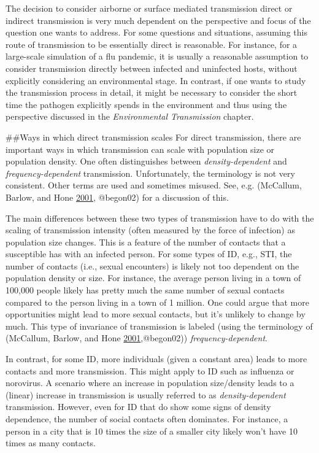 \documentclass[]{book}
\theoremstyle{definition}
\theoremstyle{definition}
\theoremstyle{definition}
\theoremstyle{remark}
\begin{document}
The decision to consider airborne or surface mediated transmission
direct or indirect transmission is very much dependent on the
perspective and focus of the question one wants to address. For some
questions and situations, assuming this route of transmission to be
essentially direct is reasonable. For instance, for a large-scale
simulation of a flu pandemic, it is usually a reasonable assumption to
consider transmission directly between infected and uninfected hosts,
without explicitly considering an environmental stage. In contrast, if
one wants to study the transmission process in detail, it might be
necessary to consider the short time the pathogen explicitly spends in
the environment and thus using the perspective discussed in the
\emph{Environmental Transmission} chapter.

\#\#Ways in which direct transmission scales For direct transmission,
there are important ways in which transmission can scale with population
size or population density. One often distinguishes between
\emph{density-dependent} and \emph{frequency-dependent} transmission.
Unfortunately, the terminology is not very consistent. Other terms are
used and sometimes misused. See, e.g. (McCallum, Barlow, and Hone
\protect\hyperlink{ref-mccallum01}{2001}, @begon02) for a discussion of
this.

The main differences between these two types of transmission have to do
with the scaling of transmission intensity (often measured by the force
of infection) as population size changes. This is a feature of the
number of contacts that a susceptible has with an infected person. For
some types of ID, e.g., STI, the number of contacts (i.e., sexual
encounters) is likely not too dependent on the population density or
size. For instance, the average person living in a town of 100,000
people likely has pretty much the same number of sexual contacts
compared to the person living in a town of 1 million. One could argue
that more opportunities might lead to more sexual contacts, but it's
unlikely to change by much. This type of invariance of transmission is
labeled (using the terminology of (McCallum, Barlow, and Hone
\protect\hyperlink{ref-mccallum01}{2001},@begon02))
\emph{frequency-dependent}.

In contrast, for some ID, more individuals (given a constant area) leads
to more contacts and more transmission. This might apply to ID such as
influenza or norovirus. A scenario where an increase in population
size/density leads to a (linear) increase in transmission is usually
referred to as \emph{density-dependent} transmission. However, even for
ID that do show some signs of density dependence, the number of social
contacts often dominates. For instance, a person in a city that is 10
times the size of a smaller city likely won't have 10 times as many
contacts.
\end{document}
